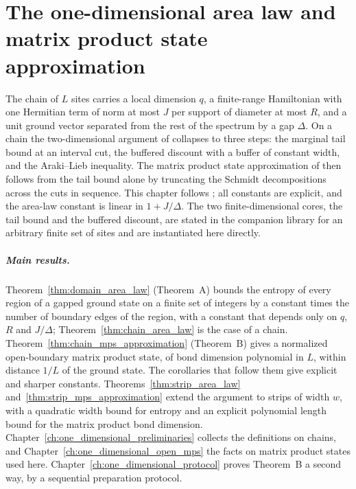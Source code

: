 \chapter{The one-dimensional area law and matrix product state approximation}
\label{ch:one_dimensional_chain}


The chain of $L$ sites carries a local dimension $q$, a finite-range Hamiltonian
with one Hermitian term of norm at most $J$ per support of diameter at most $R$,
and a unit ground vector separated from the rest of the spectrum by a gap
$\Delta$. On a chain the two-dimensional argument of \cite{OpenAI2026AreaLaw}
collapses to three steps: the marginal tail bound at an interval cut, the
buffered discount with a buffer of constant width, and the Araki--Lieb
inequality. The matrix product state approximation of
\cite{OpenAI2026PolynomialPEPS} then follows from the tail bound alone by
truncating the Schmidt decompositions across the cuts in sequence. This chapter
follows \cite{TNLean2026OneDimensional}; all constants are explicit, and the
area-law constant is linear in $1+J/\Delta$. The two finite-dimensional cores,
the tail bound and the buffered discount, are stated in the companion library
for an arbitrary finite set of sites and are instantiated here directly.

\paragraph{Main results.}
Theorem~\ref{thm:domain_area_law} (Theorem~A) bounds the entropy of every
region of a gapped ground state on a finite set of integers by a constant
times the number of boundary edges of the region, with a constant that
depends only on $q$, $R$ and $J/\Delta$; Theorem~\ref{thm:chain_area_law}
is the case of a chain. Theorem~\ref{thm:chain_mps_approximation}
(Theorem~B) gives a normalized open-boundary matrix product state, of bond
dimension polynomial in $L$, within distance $1/L$ of the ground state.
The corollaries that follow them give explicit and sharper constants.
Theorems~\ref{thm:strip_area_law} and~\ref{thm:strip_mps_approximation} extend
the argument to strips of width $w$, with a quadratic width bound for entropy
and an explicit polynomial length bound for the matrix product bond dimension.
Chapter~\ref{ch:one_dimensional_preliminaries} collects the definitions on
chains, and Chapter~\ref{ch:one_dimensional_open_mps} the facts on matrix
product states used here. Chapter~\ref{ch:one_dimensional_protocol} proves
Theorem~B a second way, by a sequential preparation protocol.

